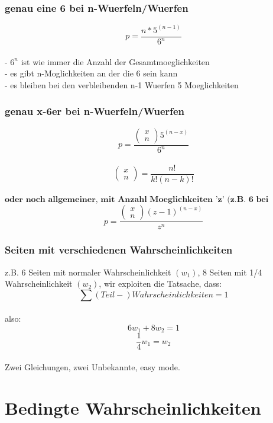 \documentclass{article}
\begin{document}
	\subsubsection{genau eine 6 bei n-Wuerfeln/Wuerfen}
		\[ p= \frac{n*5^{(n-1)}}{6^n}\]\\
		- $6^n $ ist wie immer die Anzahl der Gesamtmoeglichkeiten \\
		- es gibt n-Moglichkeiten an der die 6 sein kann \\
		- es bleiben bei den verbleibenden n-1 Wuerfen 5 Moeglichkeiten
	\subsubsection{genau x-6er bei n-Wuerfeln/Wuerfen}
		\[ p= \frac{\begin{pmatrix}
		x\\n
		\end{pmatrix}5^{(n-x)}}{6^n}\]\\
		\[\begin{pmatrix}
		x\\n
		\end{pmatrix}= \frac{n!}{k!(n-k)!}
		\]\\
		$\textbf{oder noch allgemeiner, mit Anzahl Moeglichkeiten 'z' (z.B. 6 bei Wuerfel):}$\[
		p= \frac{\begin{pmatrix}
		x\\n
		\end{pmatrix}(z-1)^{(n-x)}}{z^n}
		\]
	\subsubsection{Seiten mit verschiedenen Wahrscheinlichkeiten}
		z.B. 6 Seiten mit normaler Wahrscheinlichkeit $(w_1)$, 8 Seiten mit 1/4 Wahrscheinlichkeit
		$(w_2)$, wir exploiten die Tatsache, dass: \\ \[ \sum
		(Teil-)Wahrscheinlichkeiten = 1 \]\\
		also:\\
		\begin{equation}	
			6w_1 + 8w_2 = 1 \end{equation}
		\begin{equation}	
			\frac{1}{4}w_1 = w_2 
		\end{equation}\\
		Zwei Gleichungen, zwei Unbekannte, easy mode.
	
	\section{Bedingte Wahrscheinlichkeiten}
\end{document}
